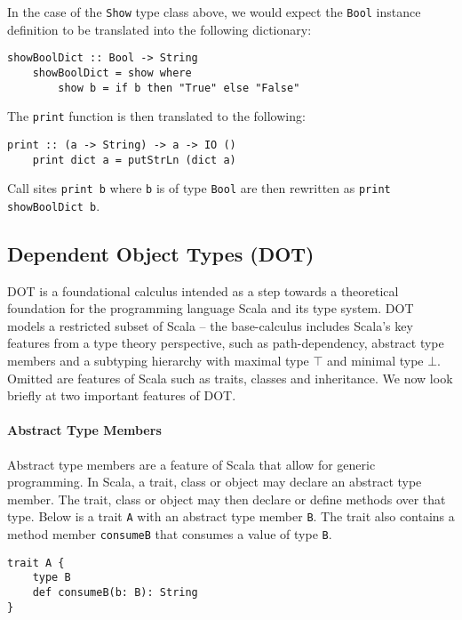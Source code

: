 In the case of the \texttt{Show} type class above, we would expect the
\texttt{Bool} instance definition to be translated into the following
dictionary:
\begin{lstlisting}[mathescape]
    showBoolDict :: Bool -> String
    showBoolDict = show where
        show b = if b then "True" else "False"
\end{lstlisting}

\noindent The \texttt{print} function is then translated to the following:
\begin{lstlisting}[mathescape]
    print :: (a -> String) -> a -> IO ()
    print dict a = putStrLn (dict a)
\end{lstlisting}

\noindent Call sites \texttt{print b} where \texttt{b} is of type \texttt{Bool}
are then rewritten as \texttt{print showBoolDict b}.

\subsection{Dependent Object Types (DOT)}
DOT \cite{AMO12, ARO14, AR16, AGORS16, AR17} is a foundational calculus
intended as a step towards a theoretical foundation for the programming
language Scala and its type system. DOT models a restricted subset of Scala --
the base-calculus includes Scala's key features from a type theory perspective,
such as path-dependency, abstract type members and a subtyping hierarchy with
maximal type $\top$ and minimal type $\bot$. Omitted are features of Scala such
as traits, classes and inheritance. We now look briefly at two important
features of DOT.

\paragraph{Abstract Type Members}
Abstract type members are a feature of Scala that allow for generic programming.
In Scala, a trait, class or object may declare an abstract type member. The
trait, class or object may then declare or define methods over that type. Below
is a trait \texttt{A} with an abstract type member \texttt{B}. The trait also
contains a method member \texttt{consumeB} that consumes a value of type
\texttt{B}.

\begin{minipage}{\linewidth}
\begin{lstlisting}[mathescape]
trait A {
    type B
    def consumeB(b: B): String
}
\end{lstlisting}
\end{minipage}

